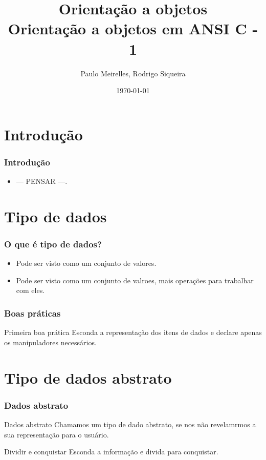 \documentclass{beamer}
\title{Orientação a objetos\\ \textbf{Orientação a objetos em ANSI C - 1}}
\author{Paulo Meirelles, Rodrigo Siqueira}
\date{\today}
\institute{\textbf{Universidade de Brasília - Faculdade do Gama}}
\begin{document}
\begin{frame}
  \titlepage
\end{frame}
  
\section{Introdução}
\begin{frame}
  \frametitle{Introdução}
  \begin{itemize}
   \item --- PENSAR ---.
  \end{itemize}
\end{frame}

\section{Tipo de dados}
\begin{frame}
  \frametitle{O que é tipo de dados?}
  \begin{itemize}
    \item Pode ser visto como um conjunto de valores.
    \item Pode ser visto como um conjunto de valroes, mais operações para 
      trabalhar com eles.
  \end{itemize}
\end{frame}

\begin{frame}
 \frametitle{Boas práticas}
 \begin{block}{Primeira boa prática}
  Esconda a representação dos itens de dados e declare apenas os manipuladores 
  necessários.
 \end{block}
\end{frame}

\section{Tipo de dados abstrato}
\begin{frame}
 \frametitle{Dados abstrato}
 \begin{block}{Dados abstrato}
  Chamamos um tipo de dado abstrato, se nos não revelamrmos a sua representação 
  para o usuário.
 \end{block}
 \begin{block}{Dividir e conquistar}
  Esconda a informação e divida para conquistar.
 \end{block}
\end{frame}
\end{document}
